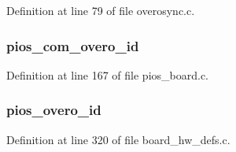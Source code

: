 Definition at line 79 of file overosync.\-c.

\hypertarget{group___telemetry_module_gad93c8058f5c4d01e2ecc5670a0fa5407}{
\subsubsection[{pios\-\_\-com\-\_\-overo\-\_\-id}]{ pios\-\_\-com\-\_\-overo\-\_\-id}}\label{group___telemetry_module_gad93c8058f5c4d01e2ecc5670a0fa5407}


Definition at line 167 of file pios\-\_\-board.\-c.

\hypertarget{group___telemetry_module_ga6068626ce5d15d09ba077204ea2fd43d}{
\subsubsection[{pios\-\_\-overo\-\_\-id}]{ pios\-\_\-overo\-\_\-id}}\label{group___telemetry_module_ga6068626ce5d15d09ba077204ea2fd43d}


Definition at line 320 of file board\-\_\-hw\-\_\-defs.\-c.

